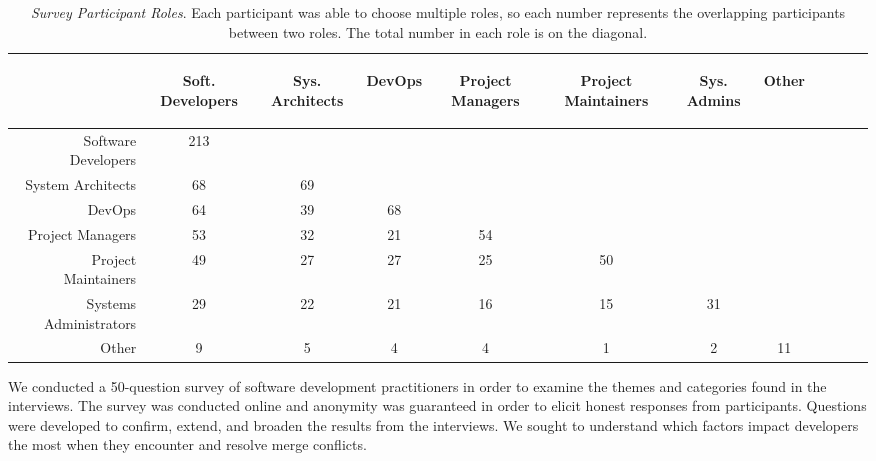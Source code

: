\begin{table}[!]
\renewcommand{\arraystretch}{1.3}
\caption{\textit{Survey Participant Roles}. Each participant was able to choose multiple roles, so each number represents the overlapping participants between two roles. The total number in each role is on the diagonal.}
\label{survey_roles}
\centering
\begin{tabularx}{0.45\textwidth}{@{}r|*{10}{C}c@{}}
\toprule
\addlinespace[5.4em]
	& \begin{rotate}{45} Soft. Developers \end{rotate} 
	& \begin{rotate}{45} Sys. Architects \end{rotate} 
	& \begin{rotate}{45} DevOps \end{rotate} 
	& \begin{rotate}{45} Project Managers \end{rotate}
	& \begin{rotate}{45} Project Maintainers \end{rotate}
	& \begin{rotate}{45} Sys. Admins \end{rotate}
	& \begin{rotate}{45} Other \end{rotate}\\
\midrule
	Software Developers & 213 & & & & & & \\
	System Architects & 68 & 69 & & & & & \\
	DevOps & 64 & 39 & 68 & & & & \\
	Project Managers & 53 & 32 & 21 & 54 & & & \\
	Project Maintainers & 49 & 27 & 27 & 25 & 50 & & \\
	Systems Administrators & 29 & 22 & 21 & 16 & 15 & 31 & \\
	Other & 9 & 5 & 4 & 4 & 1 & 2 & 11 \\
\bottomrule
\end{tabularx}
\end{table}

We conducted a 50-question survey of software development practitioners in order to examine the themes and categories found in the interviews.
The survey was conducted online and anonymity was guaranteed in order to elicit honest responses from participants.
Questions were developed to confirm, extend, and broaden the results from the interviews.
We sought to understand which factors impact developers the most when they encounter and resolve merge conflicts.

